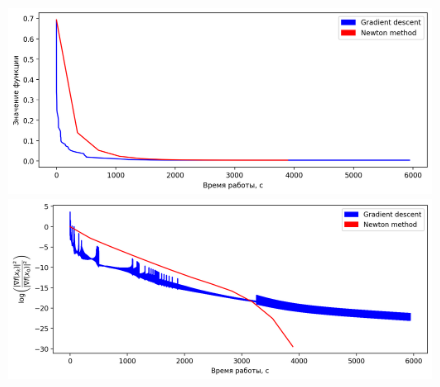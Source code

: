 \documentclass[notitlepage]{article}
\begin{document}
\begin{figure}[ht]
\begin{minipage}[t]{.5\textwidth}
  \centering
  \includegraphics[width=\textwidth, keepaspectratio]{plots/gisette_scale.bz2_plot_func.png}
\end{minipage}
\begin{minipage}[t]{.5\textwidth}
  \centering
  \includegraphics[width=\textwidth, keepaspectratio]{plots/gisette_scale.bz2_plot_grad.png}
\end{minipage}
\end{figure}
\end{document}

